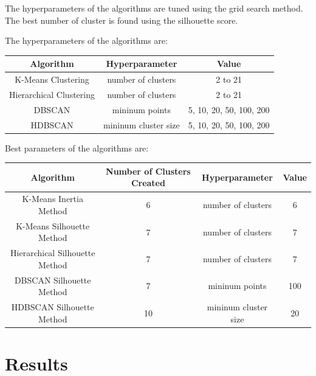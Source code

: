 \documentclass{article}
\begin{document}
            The hyperparameters of the algorithms are tuned using the grid search method.
            The best number of cluster is found using the silhouette score.

            The hyperparameters of the algorithms are:

            \begin{tabular}{|c|c|c|}
                \hline
                Algorithm & Hyperparameter & Value \\
                \hline
                K-Means Clustering & number of clusters & 2 to 21 \\
                \hline
                Hierarchical Clustering & number of clusters & 2 to 21 \\
                \hline
                DBSCAN & mininum points  & 5, 10, 20, 50, 100, 200  \\
                \hline
                HDBSCAN & mininum cluster size  & 5, 10, 20, 50, 100, 200  \\
                \hline
            \end{tabular}

            \hfill

            Best parameters of the algorithms are:

                \begin{tabular}{|c|c|c|c|}
                    \hline
                    Algorithm & Number of Clusters Created & Hyperparameter & Value \\
                    \hline
                    K-Means Inertia Method & 6 & number of clusters & 6 \\
                    \hline
                    K-Means Silhouette Method & 7 & number of clusters & 7 \\
                    \hline
                    Hierarchical Silhouette Method & 7 & number of clusters & 7 \\
                    \hline
                    DBSCAN Silhouette Method & 7 & mininum points  & 100  \\
                    \hline
                    HDBSCAN Silhouette Method & 10 & mininum cluster size  & 20 \\
                    \hline
                \end{tabular}

    \endgroup

    \hfill

    \begingroup
            \section{Results}
\end{document}

